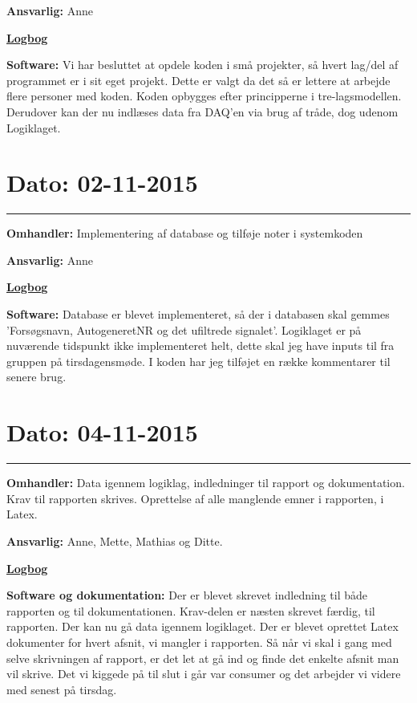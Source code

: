 \textbf{Ansvarlig:} Anne

\underline{\textbf{Logbog}}

\textbf{Software: }Vi har besluttet at opdele koden i små projekter, så hvert lag/del af programmet er i sit eget projekt. Dette er valgt da det så er lettere at arbejde flere personer med koden. Koden opbygges efter principperne i tre-lagsmodellen. Derudover kan der nu indlæses data fra DAQ'en via brug af tråde, dog udenom Logiklaget. 
\\

\section{Dato: 02-11-2015}
\hrule
\textbf{Omhandler:} Implementering af database og tilføje noter i systemkoden

\textbf{Ansvarlig:} Anne

\underline{\textbf{Logbog}}

\textbf{Software: }Database er blevet implementeret, så der i databasen skal gemmes 'Forsøgsnavn, AutogeneretNR og det ufiltrede signalet'. Logiklaget er på nuværende tidspunkt ikke implementeret helt, dette skal jeg have inputs til fra gruppen på tirsdagensmøde.  
I koden har jeg tilføjet en række kommentarer til senere brug.
\\

\section{Dato: 04-11-2015}
\hrule
\textbf{Omhandler:} Data igennem logiklag, indledninger til rapport og dokumentation. Krav til rapporten skrives. 
Oprettelse af alle manglende emner i rapporten, i Latex. 

\textbf{Ansvarlig:} Anne, Mette, Mathias og Ditte. 

\underline{\textbf{Logbog}}

\textbf{Software og dokumentation: }Der er blevet skrevet indledning til både rapporten og til dokumentationen. Krav-delen er næsten skrevet færdig, til rapporten. 
Der kan nu gå data igennem logiklaget. 
Der er blevet oprettet Latex dokumenter for hvert afsnit, vi mangler i rapporten. Så når vi skal i gang med selve skrivningen af rapport, er det let at gå ind og finde det enkelte afsnit man vil skrive. 
Det vi kiggede på til slut i går var consumer og det arbejder vi videre med senest på tirsdag. 
\\